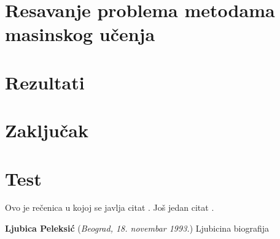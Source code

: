 \documentclass[12pt,oneside]{memoir}
\begin{document}
\chapter{Resavanje problema metodama masinskog učenja}

\chapter{Rezultati}



\chapter{Zaključak}

\chapter{Test}

Ovo je rečenica u kojoj se javlja citat \cite{PetrovicMikic2015}.
Još jedan citat \cite{GuSh:243}.





% 
\literatura

\backmatter


\begin{biografija}
  \textbf{Ljubica Peleksić} (\emph{Beograd,
    18.  novembar 1993.}) 
	Ljubicina biografija
\end{biografija}
\end{document}
